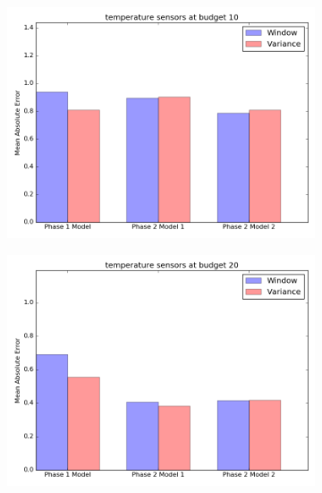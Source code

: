 \documentclass{article}
\begin{document}
\begin{figure}[h!]
	\begin{subfigure}{\linewidth}
	\includegraphics[scale=0.5]{temperature_10.png}
	\end{subfigure}
	\begin{subfigure}{\linewidth}
	\includegraphics[scale=0.5]{temperature_20.png}
	\end{subfigure}
\end{figure}

\newpage
\end{document}
